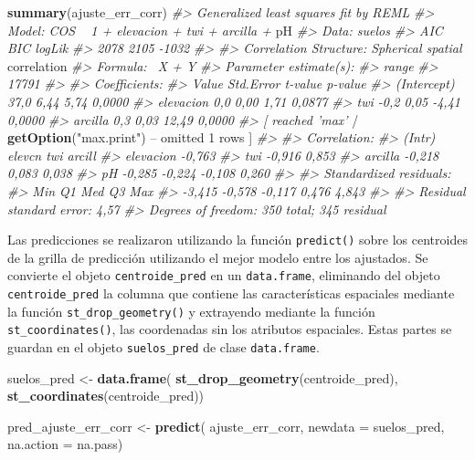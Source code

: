 \documentclass[11pt,b5paper,]{krantz}
\newenvironment{Shaded}{}{}
\newcommand{\CommentTok}[1]{\textcolor[rgb]{0.38,0.63,0.69}{\textit{#1}}}
\newcommand{\DataTypeTok}[1]{\textcolor[rgb]{0.56,0.13,0.00}{#1}}
\newcommand{\DecValTok}[1]{\textcolor[rgb]{0.25,0.63,0.44}{#1}}
\newcommand{\KeywordTok}[1]{\textcolor[rgb]{0.00,0.44,0.13}{\textbf{#1}}}
\newcommand{\NormalTok}[1]{#1}
\newcommand{\OperatorTok}[1]{\textcolor[rgb]{0.40,0.40,0.40}{#1}}
\newcommand{\StringTok}[1]{\textcolor[rgb]{0.25,0.44,0.63}{#1}}
\begin{document}
\begin{Shaded}
\begin{Highlighting}[]
\KeywordTok{summary}\NormalTok{(ajuste_err_corr)}
\CommentTok{#> Generalized least squares fit by REML}
\CommentTok{#> Model: COS ~ 1 + elevacion + twi + arcilla +}
\NormalTok{pH}
\CommentTok{#> Data: suelos}
\CommentTok{#> AIC BIC logLik}
\CommentTok{#> 2078 2105 -1032}
\CommentTok{#>}
\CommentTok{#> Correlation Structure: Spherical spatial}
\NormalTok{correlation}
\CommentTok{#> Formula: ~X + Y}
\CommentTok{#> Parameter estimate(s):}
\CommentTok{#> range}
\CommentTok{#> 17791}
\CommentTok{#>}
\CommentTok{#> Coefficients:}
\CommentTok{#> Value Std.Error t-value p-value}
\CommentTok{#> (Intercept) 37,0 6,44 5,74 0,0000}
\CommentTok{#> elevacion 0,0 0,00 1,71 0,0877}
\CommentTok{#> twi -0,2 0,05 -4,41 0,0000}
\CommentTok{#> arcilla 0,3 0,03 12,49 0,0000}
\CommentTok{#> [ reached 'max'}
    \OperatorTok{/}\StringTok{ }\KeywordTok{getOption}\NormalTok{(}\StringTok{"max.print"}\NormalTok{) }\OperatorTok{--}
\NormalTok{omitted }\DecValTok{1}\NormalTok{ rows ]}
\CommentTok{#>}
\CommentTok{#> Correlation:}
\CommentTok{#> (Intr) elevcn twi arcill}
\CommentTok{#> elevacion -0,763}
\CommentTok{#> twi -0,916 0,853}
\CommentTok{#> arcilla -0,218 0,083 0,038}
\CommentTok{#> pH -0,285 -0,224 -0,108 0,260}
\CommentTok{#>}
\CommentTok{#> Standardized residuals:}
\CommentTok{#> Min Q1 Med Q3 Max}
\CommentTok{#> -3,415 -0,578 -0,117 0,476 4,843}
\CommentTok{#>}
\CommentTok{#> Residual standard error: 4,57}
\CommentTok{#> Degrees of freedom: 350 total; 345 residual}
\end{Highlighting}
\end{Shaded}

Las predicciones se realizaron utilizando la función \texttt{predict()} sobre los centroides de la grilla de predicción utilizando el mejor modelo entre los ajustados. Se convierte el objeto \texttt{centroide\_pred} en un \texttt{data.frame}, eliminando del objeto \texttt{centroide\_pred} la columna que contiene las características espaciales mediante la función \texttt{st\_drop\_geometry()} y extrayendo mediante la función \texttt{st\_coordinates()}, las coordenadas sin los atributos espaciales. Estas partes se guardan en el objeto \texttt{suelos\_pred} de clase \texttt{data.frame}.

\begin{Shaded}
\begin{Highlighting}[]
\NormalTok{suelos_pred <-}\StringTok{ }\KeywordTok{data.frame}\NormalTok{(}
  \KeywordTok{st_drop_geometry}\NormalTok{(centroide_pred),}
  \KeywordTok{st_coordinates}\NormalTok{(centroide_pred))}


\NormalTok{pred_ajuste_err_corr <-}\StringTok{ }\KeywordTok{predict}\NormalTok{(}
\NormalTok{  ajuste_err_corr,}
  \DataTypeTok{newdata =}\NormalTok{ suelos_pred,}
  \DataTypeTok{na.action =}\NormalTok{ na.pass)}
\end{Highlighting}
\end{Shaded}
\end{document}
